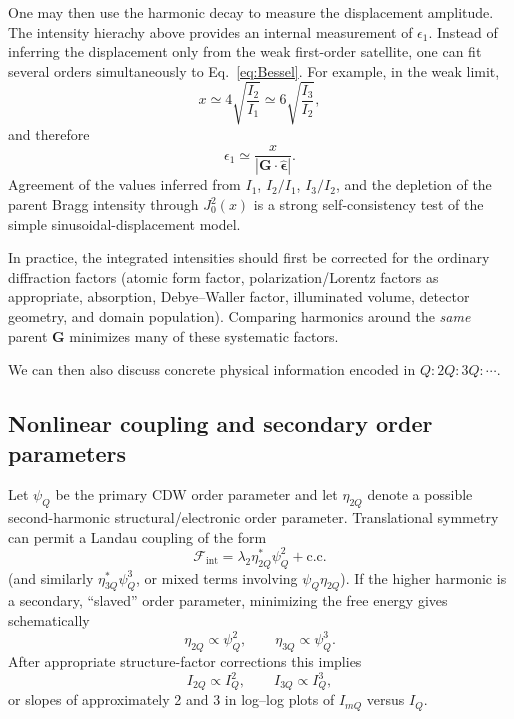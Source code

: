 \documentclass[11pt]{article}
\newcommand{\e}{\epsilon}
\newcommand{\bG}{\mathbf{G}}
\begin{document}
One may then use the harmonic decay to measure the displacement amplitude. The intensity hierachy above provides an internal measurement of $\e_1$.  Instead of inferring the displacement only from the weak first-order satellite, one can fit several orders simultaneously to Eq.~\eqref{eq:Bessel}.  For example, in the weak limit,
\begin{equation}
    x\simeq4\sqrt{\frac{I_2}{I_1}}
    \simeq6\sqrt{\frac{I_3}{I_2}},
\end{equation}
and therefore
\begin{equation}
    \e_1\simeq\frac{x}{|\bG\cdot\hat{\bm{\e}}|}.
\end{equation}
Agreement of the values inferred from $I_1$, $I_2/I_1$, $I_3/I_2$, and the depletion of the parent Bragg intensity through $J_0^2(x)$ is a strong self-consistency test of the simple sinusoidal-displacement model.

In practice, the integrated intensities should first be corrected for the ordinary diffraction factors (atomic form factor, polarization/Lorentz factors as appropriate, absorption, Debye--Waller factor, illuminated volume, detector geometry, and domain population).  Comparing harmonics around the \emph{same} parent $\bG$ minimizes many of these systematic factors.

We can then also discuss concrete physical information encoded in $Q:2Q:3Q:\cdots$.

\subsection*{Nonlinear coupling and secondary order parameters}
Let $\psi_Q$ be the primary CDW order parameter and let $\eta_{2Q}$ denote a possible second-harmonic structural/electronic order parameter.  Translational symmetry can permit a Landau coupling of the form
\begin{equation}
    \mathcal{F}_{\mathrm{int}}
    =\lambda_2\eta_{2Q}^*\psi_Q^2+\mathrm{c.c.}
\end{equation}
(and similarly $\eta_{3Q}^*\psi_Q^3$, or mixed terms involving $\psi_Q\eta_{2Q}$).  If the higher harmonic is a secondary, ``slaved'' order parameter, minimizing the free energy gives schematically
\begin{equation}
    \eta_{2Q}\propto\psi_Q^2,
    \qquad
    \eta_{3Q}\propto\psi_Q^3.
\end{equation}
After appropriate structure-factor corrections this implies
\begin{equation}
    I_{2Q}\propto I_Q^2,
    \qquad
    I_{3Q}\propto I_Q^3,
\end{equation}
or slopes of approximately 2 and 3 in log--log plots of $I_{mQ}$ versus $I_Q$.
\end{document}
